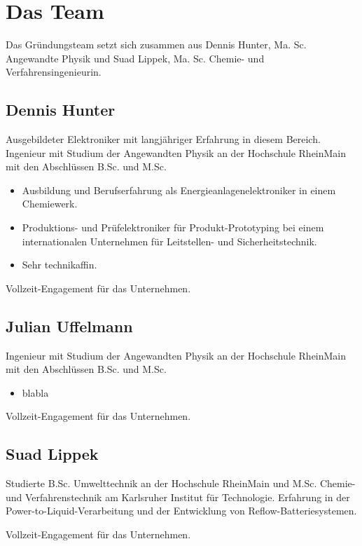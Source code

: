 \chapter{Das Team}

Das Gründungsteam setzt sich zusammen aus Dennis Hunter, Ma. Sc. Angewandte Physik und Suad Lippek, Ma. Sc. Chemie- und Verfahrensingenieurin.

\section{Dennis Hunter}

    Ausgebildeter Elektroniker mit langjähriger Erfahrung in diesem Bereich.
    Ingenieur mit Studium der Angewandten Physik an der Hochschule RheinMain mit den Abschlüssen B.Sc. und M.Sc.
    \begin{itemize}
        \item Ausbildung und Berufserfahrung als Energieanlagenelektroniker in einem Chemiewerk.
        \item Produktions- und Prüfelektroniker für Produkt-Prototyping bei einem internationalen Unternehmen für Leitstellen- und Sicherheitstechnik.
        \item Sehr technikaffin.
    \end{itemize}
    Vollzeit-Engagement für das Unternehmen.

\section{Julian Uffelmann}

    Ingenieur mit Studium der Angewandten Physik an der Hochschule RheinMain mit den Abschlüssen B.Sc. und M.Sc.
    \begin{itemize}
        \item blabla
    \end{itemize}
    Vollzeit-Engagement für das Unternehmen.

\section{Suad Lippek}

    Studierte B.Sc. Umwelttechnik an der Hochschule RheinMain und M.Sc. Chemie- und Verfahrenstechnik am Karlsruher Institut für Technologie.
    Erfahrung in der Power-to-Liquid-Verarbeitung und der Entwicklung von Reflow-Batteriesystemen.

    Vollzeit-Engagement für das Unternehmen.